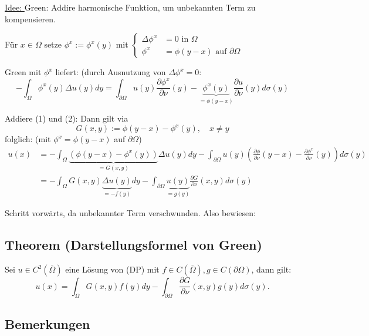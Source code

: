 \underline{Idee: } Green: Addire harmonische Funktion, um unbekannten Term zu kompensieren.

Für $x \in \Omega$ setze $\phi^x := \phi^x(y)$ mit $\begin{cases} \Delta \phi^x &= 0 \text{ in } \Omega \\ \phi^x &= \phi(y - x) \text{ auf } \partial \Omega \end{cases}$

Green mit $\phi^x$ liefert: (durch Ausnutzung von $\Delta \phi^x = 0$:
\begin{displaymath}
  - \int_\Omega \phi^x(y) \Delta u(y) dy = \int_{\partial \Omega} u(y) \frac{\partial \phi^x}{\partial \nu}(y) - \underbrace{\phi^x(y)}_{= \phi(y - x)} \frac{\partial u}{\partial \nu}(y) d\sigma(y) \tag{2}
\end{displaymath}

Addiere (1) und (2): Dann gilt via
$$
G(x,y) := \phi(y - x) - \phi^x(y), \quad x \neq y
$$
folglich: (mit $\phi^x = \phi(y - x)$ auf $\partial\Omega$)
\begin{align*}
	u(x) &= -\int_{\Omega} \underbrace{(\phi(y - x) - \phi^x(y))}_{= G(x,y)} \Delta u(y) dy - \int_{\partial \Omega} u(y) ( \frac{\partial \phi}{\partial \nu}(y - x) - \frac{\partial \phi^x}{\partial \nu}(y)) d\sigma(y) \\
	&= -\int_\Omega G(x,y) \underbrace{\Delta u(y)}_{= -f(y)} dy - \int_{\partial \Omega} \underbrace{u(y)}_{= g(y)} \frac{\partial G}{\partial \nu}(x,y) d\sigma(y)
\end{align*}

Schritt vorwärts, da unbekannter Term verschwunden. Also bewiesen:

\subsection{Theorem (Darstellungsformel von Green)}

Sei $u \in C^2(\overline\Omega)$ eine Lösung von (DP) mit $f \in C(\overline\Omega), g \in C(\partial \Omega)$, dann gilt:
$$
u(x) = \int_\Omega G(x,y) f(y) dy - \int_{\partial \Omega}  \frac{\partial G}{\partial \nu}(x,y) g(y) d\sigma(y).
$$

\subsection{Bemerkungen}

